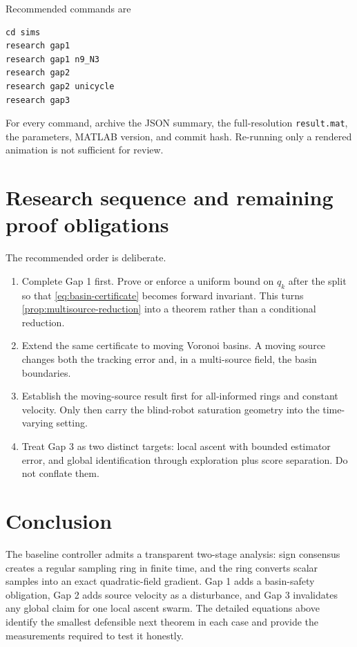 \documentclass[11pt]{article}
\newcommand{\NotationContext}[1]{\markboth{#1}{#1}}
\begin{document}
Recommended commands are
\begin{verbatim}
cd sims
research gap1
research gap1 n9_N3
research gap2
research gap2 unicycle
research gap3
\end{verbatim}
For every command, archive the JSON summary, the full-resolution \texttt{result.mat}, the parameters, MATLAB version, and commit hash. Re-running only a rendered animation is not sufficient for review.

\section{Research sequence and remaining proof obligations}\label{sec:sequence}
\NotationContext{valid}

The recommended order is deliberate.
\begin{enumerate}
    \item Complete Gap 1 first. Prove or enforce a uniform bound on $q_k$ after the split so that \eqref{eq:basin-certificate} becomes forward invariant. This turns \cref{prop:multisource-reduction} into a theorem rather than a conditional reduction.
    \item Extend the same certificate to moving Voronoi basins. A moving source changes both the tracking error and, in a multi-source field, the basin boundaries.
    \item Establish the moving-source result first for all-informed rings and constant velocity. Only then carry the blind-robot saturation geometry into the time-varying setting.
    \item Treat Gap 3 as two distinct targets: local ascent with bounded estimator error, and global identification through exploration plus score separation. Do not conflate them.
\end{enumerate}

\section{Conclusion}

The baseline controller admits a transparent two-stage analysis: sign consensus creates a regular sampling ring in finite time, and the ring converts scalar samples into an exact quadratic-field gradient. Gap 1 adds a basin-safety obligation, Gap 2 adds source velocity as a disturbance, and Gap 3 invalidates any global claim for one local ascent swarm. The detailed equations above identify the smallest defensible next theorem in each case and provide the measurements required to test it honestly.
\end{document}
